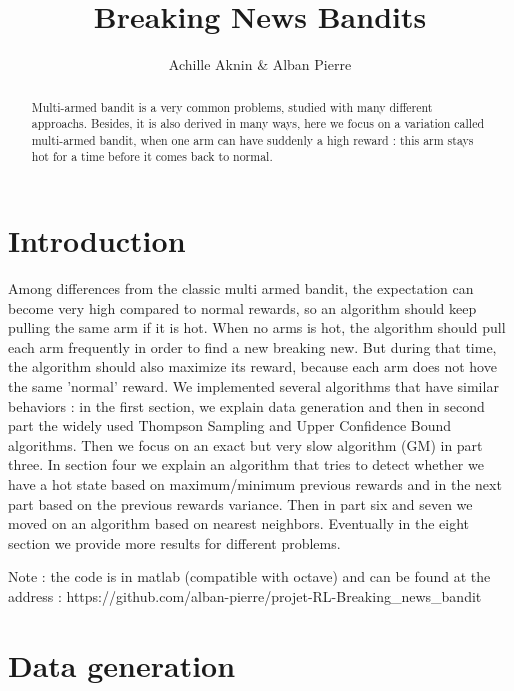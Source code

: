 \documentclass{article} %
\title{Breaking News Bandits}
\author{Achille Aknin \& Alban Pierre}
\begin{document}
\maketitle

\begin{abstract}
Multi-armed bandit is a very common problems, studied with many different approachs. Besides, it is also derived in many ways, here we focus on a variation called multi-armed bandit, when one arm can have suddenly a high reward : this arm stays hot for a time before it comes back to normal.
\end{abstract}

\section{Introduction}

Among differences from the classic multi armed bandit, the expectation can become very high compared to normal rewards, so an algorithm should keep pulling the same arm if it is hot. When no arms is hot, the algorithm should pull each arm frequently in order to find a new breaking new. But during that time, the algorithm should also maximize its reward, because each arm does not hove the same 'normal' reward. We implemented several algorithms that have similar behaviors : in the first section, we explain data generation and then in second part the widely used Thompson Sampling and Upper Confidence Bound algorithms. Then we focus on an exact but very slow algorithm (GM) in part three. In section four we explain an algorithm that tries to detect whether we have a hot state based on maximum/minimum previous rewards and in the next part based on the previous rewards variance. Then in part six and seven we moved on an algorithm based on nearest neighbors. Eventually in the eight section we provide more results for different problems.
\newline

Note : the code is in matlab (compatible with octave) and can be found at the address : https://github.com/alban-pierre/projet-RL-Breaking\_news\_bandit


\section{Data generation}
\end{document}
